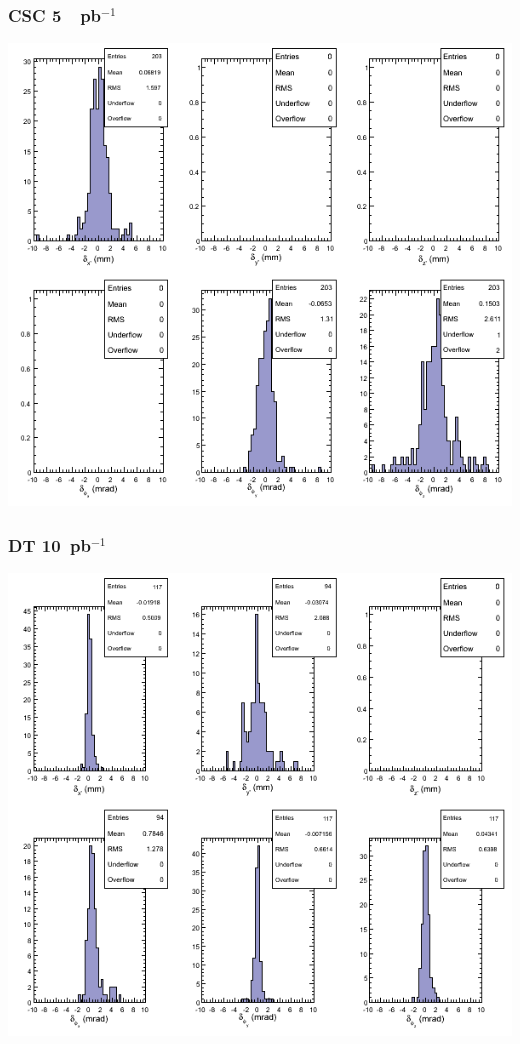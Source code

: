 \documentclass[compress]{beamer}
\begin{document}
\begin{frame}
\frametitle{CSC 5~~pb$^{-1}$}
\includegraphics[width=0.8\linewidth]{il05_CSC_00.png}
\end{frame}

\begin{frame}
\frametitle{DT 10~pb$^{-1}$}
\includegraphics[width=0.8\linewidth]{il10_DT_00.png}
\end{frame}
\end{document}
